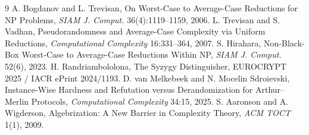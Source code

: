 \documentclass[11pt]{article}
\begin{document}
\begin{thebibliography}{9}
 A. Bogdanov and L. Trevisan, On Worst-Case to Average-Case Reductions for NP Problems, \emph{SIAM J. Comput.} 36(4):1119--1159, 2006.
 L. Trevisan and S. Vadhan, Pseudorandomness and Average-Case Complexity via Uniform Reductions, \emph{Computational Complexity} 16:331--364, 2007.
 S. Hirahara, Non-Black-Box Worst-Case to Average-Case Reductions Within NP, \emph{SIAM J. Comput.} 52(6), 2023.
 H. Randriambololona, The Syzygy Distinguisher, EUROCRYPT 2025 / IACR ePrint 2024/1193.
 D. van Melkebeek and N. Mocelin Sdroievski, Instance-Wise Hardness and Refutation versus Derandomization for Arthur--Merlin Protocols, \emph{Computational Complexity} 34:15, 2025.
 S. Aaronson and A. Wigderson, Algebrization: A New Barrier in Complexity Theory, \emph{ACM TOCT} 1(1), 2009.
\end{thebibliography}
\end{document}
